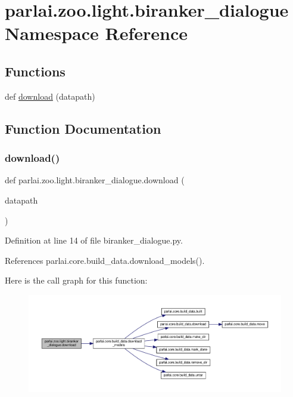\hypertarget{namespaceparlai_1_1zoo_1_1light_1_1biranker__dialogue}{}\section{parlai.\+zoo.\+light.\+biranker\+\_\+dialogue Namespace Reference}
\label{namespaceparlai_1_1zoo_1_1light_1_1biranker__dialogue}
\subsection*{Functions}
\begin{DoxyCompactItemize}
\item 
def \hyperlink{namespaceparlai_1_1zoo_1_1light_1_1biranker__dialogue_a05cb4ae259c43c98f9def9a34b97316a}{download} (datapath)
\end{DoxyCompactItemize}


\subsection{Function Documentation}
\mbox{\label{namespaceparlai_1_1zoo_1_1light_1_1biranker__dialogue_a05cb4ae259c43c98f9def9a34b97316a}} 
\subsubsection{\texorpdfstring{download()}{download()}}
{\footnotesize\ttfamily def parlai.\+zoo.\+light.\+biranker\+\_\+dialogue.\+download (\begin{DoxyParamCaption}\item[{}]{datapath }\end{DoxyParamCaption})}



Definition at line 14 of file biranker\+\_\+dialogue.\+py.



References parlai.\+core.\+build\+\_\+data.\+download\+\_\+models().

Here is the call graph for this function\+:
\nopagebreak
\begin{figure}[H]
\begin{center}
\leavevmode
\includegraphics[width=350pt]{namespaceparlai_1_1zoo_1_1light_1_1biranker__dialogue_a05cb4ae259c43c98f9def9a34b97316a_cgraph}
\end{center}
\end{figure}
